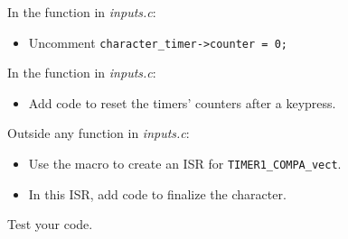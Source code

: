 In the  function in \textit{inputs.c}:
\begin{itemize}
    \item Uncomment \lstinline{character_timer->counter = 0;}
\end{itemize}

In the  function in \textit{inputs.c}:
\begin{itemize}
    \item Add code to reset the timers' counters after a keypress.
\end{itemize}

Outside any function in \textit{inputs.c}:
\begin{itemize}
    \item Use the  macro to create an ISR for \lstinline{TIMER1_COMPA_vect}.
    \item In this ISR, add code to finalize the character.
\end{itemize}

Test your code.
